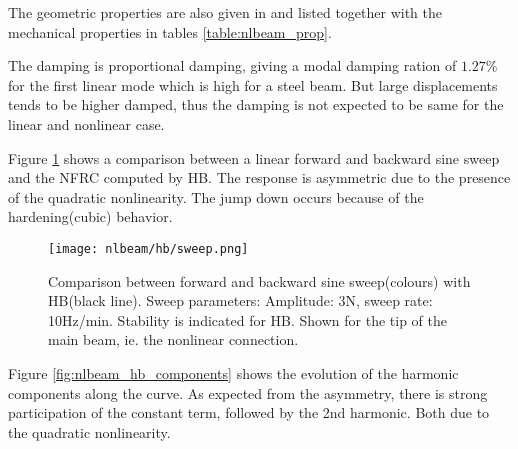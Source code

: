 The geometric properties are also given in \autocite{lenaerts2003a} and listed
together with the mechanical properties in tables \ref{table:nlbeam_prop}.
\begin{center}
\label{table:nlbeam_prop}
\end{center}


The damping is proportional damping, giving a modal damping ration of $1.27\%$
for the first linear mode which is high for a steel beam. But large
displacements tends to be higher damped, thus the damping is not expected to be
same for the linear and nonlinear case.

Figure \ref{fig:nlbeam_sweep} shows a comparison between a linear forward and
backward sine sweep and the NFRC computed by HB. The response
is asymmetric due to the presence of the quadratic nonlinearity. The jump down
occurs because of the hardening(cubic) behavior.

\begin{figure}[!ht]
  \centering
  \texttt{[image: nlbeam/hb/sweep.png]}
  \caption{Comparison between forward and backward sine sweep(colours) with
    HB(black line).
    Sweep parameters: Amplitude: 3N, sweep rate: 10Hz/min. Stability is indicated for
    HB. Shown for the tip of the main beam, ie. the nonlinear connection.}
  \label{fig:nlbeam_sweep}
\end{figure}

Figure \ref{fig:nlbeam_hb_components} shows the evolution of the harmonic
components along the curve. As expected from the asymmetry, there is strong
participation of the constant term, followed by the 2nd harmonic. Both due to
the quadratic nonlinearity.

